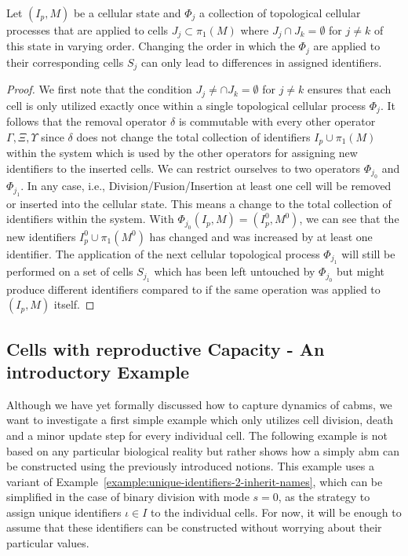 \begin{proposition}
    Let $(I_p,M)$ be a cellular state and $\Phi_j$ a collection of topological cellular processes
    that are applied to cells $J_j\subset\pi_1(M)$ where $J_j\cap J_k=\emptyset$ for $j\neq k$ of
    this state in varying order.
    Changing the order in which the $\Phi_j$ are applied to their corresponding cells $S_j$ can only
    lead to differences in assigned identifiers.
    \label{proposition:changing-order-of-topological-cellular-processes}
\end{proposition}

\begin{proof}
    We first note that the condition $J_j\neq\cap J_k=\emptyset$ for $j\neq k$ ensures that each
    cell is only utilized exactly once within a single topological cellular process $\Phi_j$.
    It follows that the removal operator $\delta$ is commutable with every other operator
    $\Gamma,\Xi,\Upsilon$ since $\delta$ does not change the total collection of identifiers
    $I_p\cup\pi_1(M)$ within the system which is used by the other operators for assigning new
    identifiers to the inserted cells.
    We can restrict ourselves to two operators $\Phi_{j_0}$ and $\Phi_{j_1}$.
    In any case, i.e., Division/Fusion/Insertion at least one cell will be removed or inserted into
    the cellular state.
    This means a change to the total collection of identifiers within the system.
    With $\Phi_{j_0}(I_p,M)=(I_p^0,M^0)$, we can see that the new identifiers $I_p^0\cup\pi_1(M^0)$
    has changed and was increased by at least one identifier.
    The application of the next cellular topological process $\Phi_{j_1}$ will still be performed on
    a set of cells $S_{j_1}$ which has been left untouched by $\Phi_{j_0}$ but might produce
    different identifiers compared to if the same operation was applied to $(I_p,M)$ itself.
\end{proof}

\subsection{Cells with reproductive Capacity - An introductory Example}
Although we have yet formally discussed how to capture dynamics of \acp{cabm}, we want to
investigate a first simple example which only utilizes cell division, death and a minor update step
for every individual cell.
The following example is not based on any particular biological reality but rather shows how a
simply \ac{abm} can be constructed using the previously introduced notions.
This example uses a variant of Example~\ref{example:unique-identifiers-2-inherit-names}, which can
be simplified in the case of binary division with mode $s=0$, as the strategy to assign unique
identifiers $\iota\in I$ to the individual cells.
For now, it will be enough to assume that these identifiers can be constructed without worrying
about their particular values.

